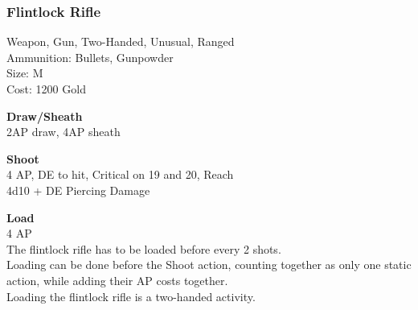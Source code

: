 \subsubsection{Flintlock Rifle}\label{weapon:flintlockRifle}
Weapon, Gun, Two-Handed, Unusual, Ranged\\
Ammunition: Bullets, Gunpowder\\
Size: M\\
Cost: 1200 Gold

\textbf{Draw/Sheath} \\
2AP draw, 4AP sheath

\textbf{Shoot} \\
4 AP, DE to hit, Critical on 19 and 20,  Reach\\
4d10 + DE Piercing Damage

\textbf{Load} \\
4 AP\\
The flintlock rifle has to be loaded before every 2 shots.\\
Loading can be done before the Shoot action, counting together as only one static action, while adding their AP costs together.\\
Loading the flintlock rifle is a two-handed activity.
